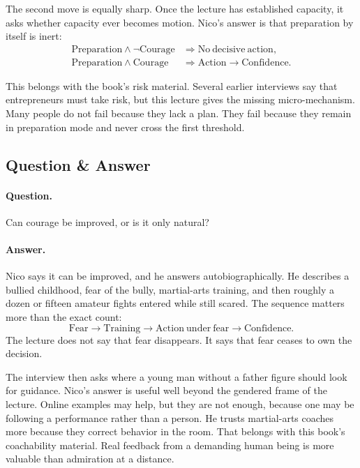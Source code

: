 \documentclass[11pt,oneside]{book}
\begin{document}
The second move is equally sharp. Once the lecture has established capacity, it asks whether capacity ever becomes motion. Nico's answer is that preparation by itself is inert:
\begin{align}
\mathrm{Preparation}\land \neg \mathrm{Courage}
&\Rightarrow
\mathrm{No\ decisive\ action},\\
\mathrm{Preparation}\land \mathrm{Courage}
&\Rightarrow
\mathrm{Action}\to \mathrm{Confidence}.
\end{align}

This belongs with the book's risk material. Several earlier interviews say that entrepreneurs must take risk, but this lecture gives the missing micro-mechanism. Many people do not fail because they lack a plan. They fail because they remain in preparation mode and never cross the first threshold.

\subsection{Question \& Answer}

\paragraph{Question.} Can courage be improved, or is it only natural?

\paragraph{Answer.} Nico says it can be improved, and he answers autobiographically. He describes a bullied childhood, fear of the bully, martial-arts training, and then roughly a dozen or fifteen amateur fights entered while still scared. The sequence matters more than the exact count:
\begin{equation}
\mathrm{Fear}
\to
\mathrm{Training}
\to
\mathrm{Action\ under\ fear}
\to
\mathrm{Confidence}.
\end{equation}
The lecture does not say that fear disappears. It says that fear ceases to own the decision.

The interview then asks where a young man without a father figure should look for guidance. Nico's answer is useful well beyond the gendered frame of the lecture. Online examples may help, but they are not enough, because one may be following a performance rather than a person. He trusts martial-arts coaches more because they correct behavior in the room. That belongs with this book's coachability material. Real feedback from a demanding human being is more valuable than admiration at a distance.
\end{document}
